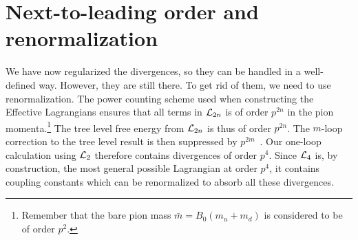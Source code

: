 \section{Next-to-leading order and renormalization}
We have now regularized the divergences, so they can be handled in a well-defined way.
However, they are still there.
To get rid of them, we need to use renormalization.
The power counting scheme used when constructing the Effective Lagrangians ensures that all terms in $\mathcal{L}_{2n}$ is of order $p^{2n}$ in the pion momenta.\footnote{Remember that the bare pion mass $\bar m = B_0(m_u + m_d)$ is considered to be of order $p^2$.}
The tree level free energy from $\mathcal{L}_{2n}$ is thus of order $p^{2n}$.
The $m$-loop correction to the tree level result is then suppressed by $p^{2m}$~\cite{Gasser-Leutwyler:chiral,WeinbergPhenom}.
Our one-loop calculation using $\mathcal{L}_2$ therefore contains divergences of order $p^{4}$. 
Since $\mathcal{L}_4$ is, by construction, the most general possible Lagrangian at order $p^4$, it contains coupling constants which can be renormalized to absorb all these divergences.

